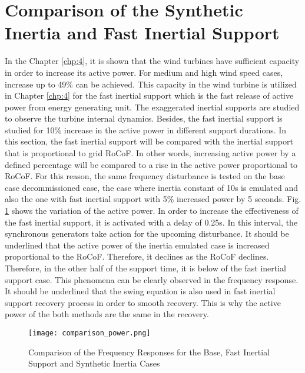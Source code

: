 \section{Comparison of the Synthetic Inertia and Fast Inertial Support}
In the Chapter \ref{chp:4}, it is shown that the wind turbines have sufficient capacity in order to increase its active power. For medium and high wind speed cases, increase up to 49\% can be achieved. This capacity in the wind turbine is utilized in Chapter \ref{chp:4} for the fast inertial support which is the fast release of active power from energy generating unit. The exaggerated inertial supports are studied to observe the turbine internal dynamics. Besides, the fast inertial support is studied for 10\% increase in the active power in different support durations. In this section, the fast inertial support will be compared with the inertial support that is proportional to grid RoCoF. In other words, increasing active power by a defined percentage will be compared to a rise in the active power proportional to RoCoF. For this reason, the same frequency disturbance is tested on the base case decommissioned case, the case where inertia constant of 10s is emulated and also the one with fast inertial support with 5\% increased power by 5 seconds. Fig. \ref{Comp_power} shows the variation of the active power. In order to increase the effectiveness of the fast inertial support, it is activated with a delay of 0.25s. In this interval, the synchronous generators take action for the upcoming disturbance. It should be underlined that the active power of the inertia emulated case is increased proportional to the RoCoF. Therefore, it declines as the RoCoF declines. Therefore, in the other half of the support time, it is below of the fast inertial support case. This phenomena can be clearly observed in the frequency response. It should be underlined that the swing equation is also used in fast inertial support recovery process in order to smooth recovery. This is why the active power of the both methods are the same in the recovery.\par
\begin{figure}[h]
	\centering
	\texttt{[image: comparison\_power.png]}
	\caption{Comparison of the Frequency Responses for the Base, Fast Inertial Support and Synthetic Inertia Cases}
	\label{Comp_power}
\end{figure}
